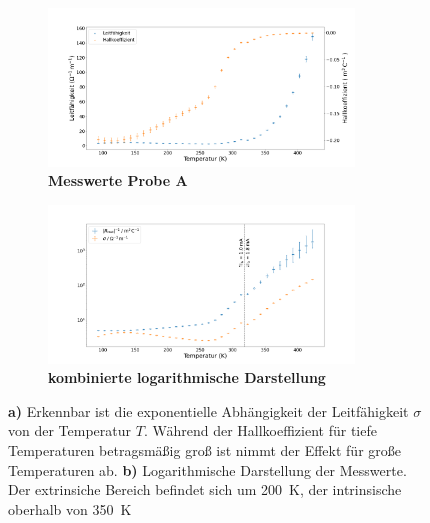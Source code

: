 \begin{figure}
	\centering
	\begin{subfigure}[h]{0.45\linewidth}
	\includegraphics[height=4.2cm]{./fig/probe_A_measurement.png}
	\caption{\textbf{Messwerte Probe A}\label{fig:measurement_A}}
	\end{subfigure}
	\hfill
	\begin{subfigure}[h]{0.45\linewidth}
	\includegraphics[height=4.2cm]{./fig/probe_A_combined_plot.png}
	\caption{\textbf{kombinierte logarithmische Darstellung}
\label{fig:logarithmic_A}}
	\end{subfigure}
	\caption*{\textbf{a)} Erkennbar ist die exponentielle Abhängigkeit der 
Leitfähigkeit $\sigma$ von der Temperatur $T$. Während der Hallkoeffizient für tiefe
Temperaturen betragsmäßig groß ist nimmt der Effekt für große Temperaturen ab. 
\textbf{b)} Logarithmische Darstellung der Messwerte. Der extrinsiche Bereich 
befindet sich um \SI{200}{\kelvin}, der intrinsische oberhalb von \SI{350}{\kelvin} 
\label{measurements_A}}
\end{figure}


